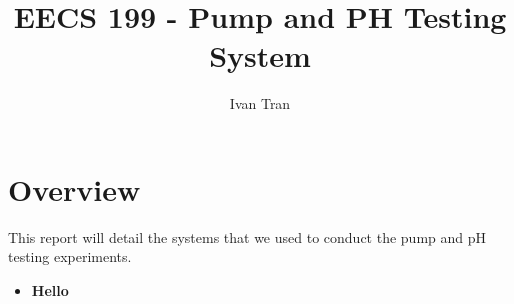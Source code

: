 \documentclass{article}
\title{EECS 199 - Pump and PH Testing System}
\author{Ivan Tran}
\date{}
\begin{document}
    \maketitle

    \section{Overview}
    \begin{flushleft}
        This report will detail the systems that we used to conduct the pump and pH testing experiments.
        \begin{itemize}
            \item \textbf{Hello}
        \end{itemize}
    \end{flushleft}
\end{document}

